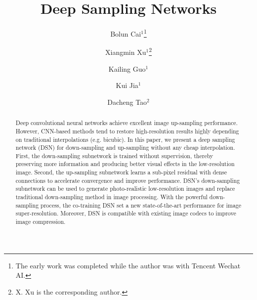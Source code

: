 \documentclass[runningheads]{llncs}
\begin{document}
\mainmatter
\def\ECCV18SubNumber{2287}  %

\title{Deep Sampling Networks} %



\author{Bolun Cai$^1$\thanks{The early work was completed while the author was with Tencent Wechat AI.} 
\and Xiangmin Xu$^{1}$\thanks{X. Xu is the corresponding author.}
\and  Kailing Guo$^1$
\and Kui Jia$^1$
\and Dacheng Tao$^2$
}


\maketitle

\begin{abstract}
Deep convolutional neural networks achieve excellent image up-sampling performance. However, CNN-based methods tend to restore high-resolution results highly depending on traditional interpolations (e.g. bicubic). In this paper, we present a deep sampling network (DSN) for down-sampling and up-sampling without any cheap interpolation. First, the down-sampling subnetwork is trained without supervision, thereby preserving more information and producing better visual effects in the low-resolution image. Second, the up-sampling subnetwork learns a sub-pixel residual with dense connections to accelerate convergence and improve performance. DSN's down-sampling subnetwork can be used to generate photo-realistic low-resolution images and replace traditional down-sampling method in image processing. With the powerful down-sampling process, the co-training DSN set a new state-of-the-art performance for image super-resolution. Moreover, DSN is compatible with existing image codecs to improve image compression.
\end{abstract}
\end{document}
